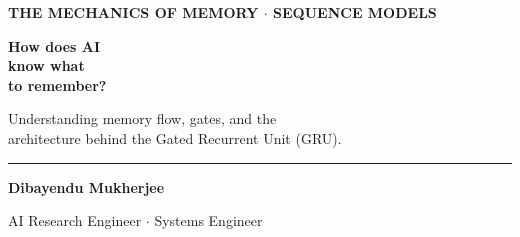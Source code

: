 \documentclass[11pt]{article}
\begin{document}
    
    \thispagestyle{empty}
    \vspace*{0.8in}
    
    \begin{center}
    
        {\fontsize{14}{16}\selectfont\color{brandblue}\textbf{
        THE MECHANICS OF MEMORY $\cdot$ \quad SEQUENCE MODELS
        }}
    
        \vspace{0.8in}
    
        {\fontsize{40}{48}\selectfont\color{brandnavy}\bfseries
        How does AI\\
        know what\\
        to remember?
        }
    
        \vspace{0.6in}
    
        {\fontsize{18}{24}\selectfont\color{brandgray}
        Understanding memory flow, gates, and the\\
        architecture behind the Gated Recurrent Unit (GRU).
        }
    
        \vfill
    
        \begin{minipage}{0.8\textwidth}
            \centering
            \rule{0.6\linewidth}{0.5pt}
    
            \vspace{0.2in}
    
            {\fontsize{12}{14}\selectfont\color{brandnavy}
            \textbf{Dibayendu Mukherjee}
            }
    
            \vspace{0.05in}
    
            {\fontsize{10}{12}\selectfont\color{brandgray}
            AI Research Engineer \quad $\cdot$ \quad Systems Engineer
            }
    
        \end{minipage}
    
    \end{center}
    
    \newpage
    
    \vspace*{0.4in}
    
\end{document}
